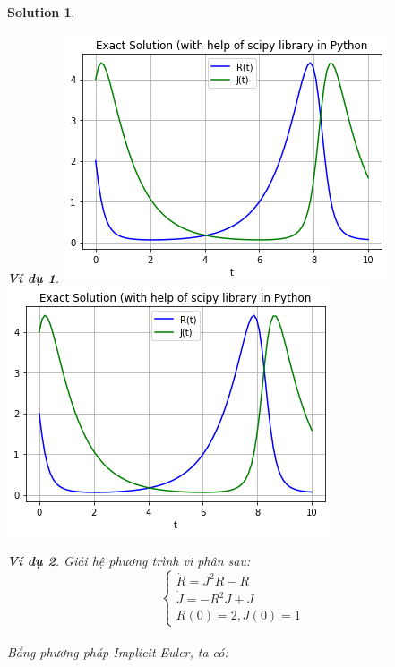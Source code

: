 \documentclass[a4paper]{article}
\newtheorem{example}{Ví dụ}
\newtheorem*{sol}{Solution}
\begin{document}
\begin{sol}
\begin{example}
    \includegraphics[width=\textwidth]{image/C4/vd2eu.png}
    \includegraphics[width=\textwidth]{image/C4/vd2ex.png}
\end{example}   
\begin{example} 
    Giải hệ phương trình vi phân sau: \\
      $$\begin{cases}
        \dot R = J^2R - R \\
        \dot J = -R^2J + J \\
        R(0) = 2, J(0) = 1 
    \end{cases}$$ \\
  Bằng phương pháp Implicit Euler, ta có: \\

\end{example}
\end{sol}
\end{document}
